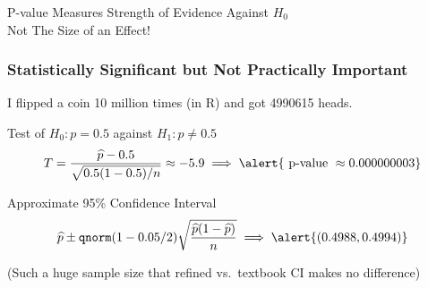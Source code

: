 \documentclass[handout]{beamer}
\begin{document}
\begin{frame}
\begin{center}
\Huge P-value Measures Strength of Evidence Against $H_0$\\ \alert{Not The Size of an Effect!}
\end{center}
\end{frame}
\begin{frame}
\frametitle{Statistically Significant but Not Practically Important}
\small
I flipped a coin 10 million times (in R) and got 4990615 heads.
\begin{block}{Test of $H_0\colon p = 0.5$ against $H_1\colon p \neq 0.5$}
$$T = \displaystyle \frac{\widehat{p} - 0.5}{\sqrt{0.5(1-0.5)/n}} \approx -5.9   \implies \alert{\mbox{ p-value } \approx 0.000000003}$$
\end{block}

\begin{block}{Approximate 95\% Confidence Interval}
 $$\widehat{p} \pm \texttt{qnorm}(1 - 0.05/2) \sqrt{\frac{\widehat{p}(1-\widehat{p})}{n}}  \implies \alert{(0.4988, 0.4994)}$$
\end{block}

\footnotesize (Such a huge sample size that refined vs.\ textbook CI makes no difference)
\large
\vspace{1em}

\alert{}
\end{frame}

\end{document}
